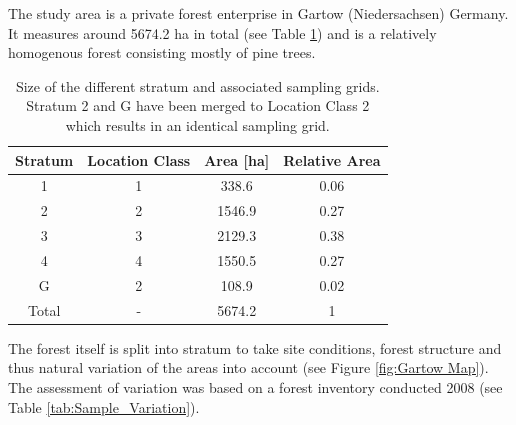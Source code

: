 
The study area is a private forest enterprise in Gartow (Niedersachsen) Germany. It measures around 5674.2 ha in total (see Table \ref{tab:sizes}) and is a relatively homogenous forest consisting mostly of pine trees.

\begin{table}[H]
\setlength\arrayrulewidth{1pt}  
\centering
\begin{tabular}{|c |c |c |c|}
\hline 
\rowcolor{Gray}
\textbf{Stratum} & \textbf{Location Class} & \textbf{Area [ha]} & \textbf{Relative Area} \\ 
\hline 
1 & 1 & 338.6 & 0.06 \\ 
\hline 
2 & 2 & 1546.9 & 0.27 \\ 
\hline 
3 & 3 & 2129.3 & 0.38 \\ 
\hline 
4 & 4 & 1550.5 & 0.27 \\ 
\hline 
G & 2 & 108.9 & 0.02 \\ 
\hline 
\rowcolor{SeaBlue}
Total & - & 5674.2 & 1 \\ 
\hline 
\end{tabular} 
\caption{Size of the different stratum and associated sampling grids. Stratum 2 and G have been merged to Location Class 2 which results in an identical sampling grid.}
\label{tab:sizes}
\end{table}

The forest itself is split into stratum to take site conditions, forest structure and thus natural variation of the areas into account (see Figure \ref{fig:Gartow Map}). The assessment of variation was based on a forest inventory conducted 2008
(see Table \ref{tab:Sample_Variation}).

